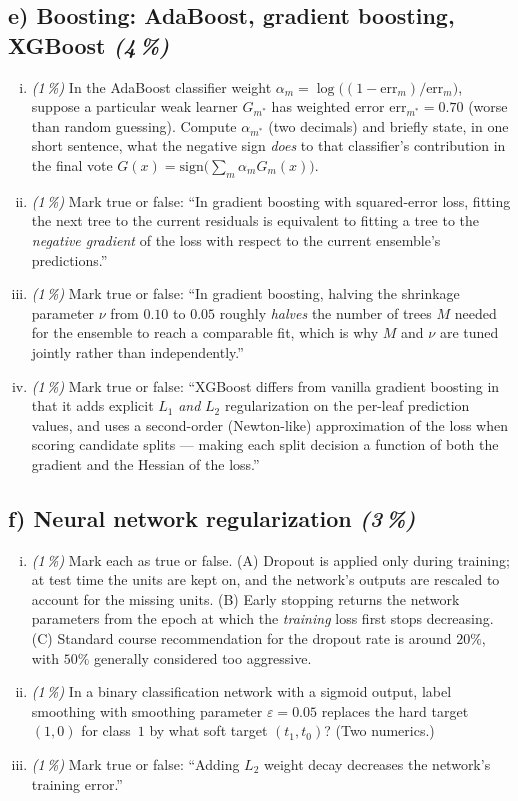 \documentclass[11pt,a4paper]{article}
\newcommand{\subpoints}[1]{\textit{(#1\,\%)}}
\begin{document}
\subsection*{e) Boosting: AdaBoost, gradient boosting, XGBoost \subpoints{4}}

\begin{enumerate}[(i)]
  \item \subpoints{1} In the AdaBoost classifier weight $\alpha_m = \log\!\bigl((1 - \mathrm{err}_m)/\mathrm{err}_m\bigr)$, suppose a particular weak learner $G_{m^*}$ has weighted error $\mathrm{err}_{m^*} = 0.70$ (worse than random guessing). Compute $\alpha_{m^*}$ (two decimals) and briefly state, in one short sentence, what the negative sign \emph{does} to that classifier's contribution in the final vote $G(x) = \mathrm{sign}\bigl(\sum_m \alpha_m G_m(x)\bigr)$.
  \item \subpoints{1} Mark true or false: ``In gradient boosting with squared-error loss, fitting the next tree to the current residuals is equivalent to fitting a tree to the \emph{negative gradient} of the loss with respect to the current ensemble's predictions.''
  \item \subpoints{1} Mark true or false: ``In gradient boosting, halving the shrinkage parameter $\nu$ from $0.10$ to $0.05$ roughly \emph{halves} the number of trees $M$ needed for the ensemble to reach a comparable fit, which is why $M$ and $\nu$ are tuned jointly rather than independently.''
  \item \subpoints{1} Mark true or false: ``XGBoost differs from vanilla gradient boosting in that it adds explicit $L_1$ \emph{and} $L_2$ regularization on the per-leaf prediction values, and uses a second-order (Newton-like) approximation of the loss when scoring candidate splits --- making each split decision a function of both the gradient and the Hessian of the loss.''
\end{enumerate}

\subsection*{f) Neural network regularization \subpoints{3}}
\begin{enumerate}[(i)]
  \item \subpoints{1} Mark each as true or false. (A) Dropout is applied only during training; at test time the units are kept on, and the network's outputs are rescaled to account for the missing units. (B) Early stopping returns the network parameters from the epoch at which the \emph{training} loss first stops decreasing. (C) Standard course recommendation for the dropout rate is around $20\%$, with $50\%$ generally considered too aggressive.
  \item \subpoints{1} In a binary classification network with a sigmoid output, label smoothing with smoothing parameter $\varepsilon = 0.05$ replaces the hard target $(1, 0)$ for class~$1$ by what soft target $(t_1, t_0)$? (Two numerics.)
  \item \subpoints{1} Mark true or false: ``Adding $L_2$ weight decay decreases the network's training error.''
\end{enumerate}
\end{document}

